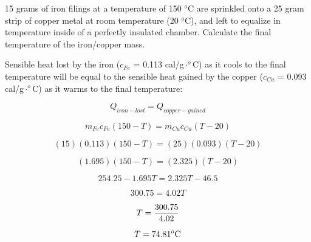 

15 grams of iron filings at a temperature of 150 $^{o}$C are sprinkled onto a 25 gram strip of copper metal at room temperature (20 $^{o}$C), and left to equalize in temperature inside of a perfectly insulated chamber.  Calculate the final temperature of the iron/copper mass.







Sensible heat lost by the iron ($c_{Fe}$ = 0.113 cal/g$\cdot ^{o}$C) as it cools to the final temperature will be equal to the sensible heat gained by the copper ($c_{Cu}$ = 0.093 cal/g$\cdot ^{o}$C) as it warms to the final temperature:

$$Q_{iron-lost} = Q_{copper-gained}$$

$$m_{Fe}c_{Fe} (150 - T) = m_{Cu}c_{Cu} (T - 20)$$

$$(15)(0.113)(150 - T) = (25)(0.093)(T - 20)$$

$$(1.695)(150 - T) = (2.325)(T - 20)$$

$$254.25 - 1.695 T = 2.325 T - 46.5$$

$$300.75 = 4.02 T$$

$$T = {300.75 \over 4.02}$$

$$T = 74.81^o\hbox{C}$$











